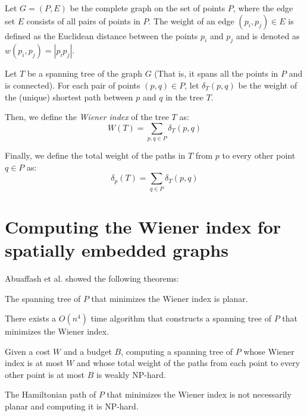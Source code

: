 \documentclass{article}
\begin{document}
Let $G = (P, E)$ be the complete graph on the set of points $P$, where the edge set $E$ consists of all pairs of points in $P$. The weight of an edge $(p_i, p_j) \in E$ is defined as the Euclidean distance between the points $p_i$ and $p_j$ and is denoted as $w(p_i, p_j) = |p_ip_j|$.

Let $T$ be a spanning tree of the graph $G$ (That is, it spans all the points in $P$ and is connected). For each pair of points $(p, q) \in P$, let $\delta_T(p, q)$ be the weight of the (unique) shortest path between $p$ and $q$ in the tree $T$.

Then, we define the \textit{Wiener index} of the tree $T$ as:
\begin{equation*}
	W(T) = \sum_{p, q \in P} \delta_T(p, q)
\end{equation*}

Finally, we define the total weight of the paths in $T$ from $p$ to every other point $q \in P$ as:
\begin{equation*}
	\delta_p(T) = \sum_{q \in P} \delta_T(p, q)
\end{equation*}

\section{Computing the Wiener index for spatially embedded graphs}

Abuaffash et al. \cite{abuaffash_2023_geom_min_spanning_tree_wiener_index} showed the following theorems:
\begin{theorem}[Abuaffash et al. 2023]
	The spanning tree of $P$ that minimizes the Wiener index is planar.
\end{theorem}

\begin{theorem}[Abuaffash et al. 2023]
	There exists a $O(n^4)$ time algorithm that constructs a spanning tree of $P$ that minimizes the Wiener index.
\end{theorem}

\begin{theorem}[Abuaffash et al. 2023]
	Given a cost $W$ and a budget $B$, computing a spanning tree of $P$ whose Wiener index is at most $W$ and whose total weight of the paths from each point to every other point is at most $B$ is weakly NP-hard.
\end{theorem}

\begin{theorem}[Abuaffash et al. 2023]
	The Hamiltonian path of $P$ that minimizes the Wiener index is not necessarily planar and computing it is NP-hard.
\end{theorem}
\end{document}
